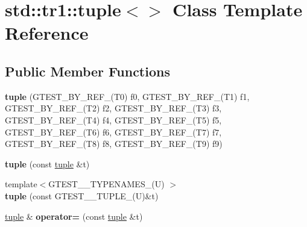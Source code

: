 \hypertarget{classstd_1_1tr1_1_1tuple}{}\section{std\+:\+:tr1\+:\+:tuple$<$$>$ Class Template Reference}
\label{classstd_1_1tr1_1_1tuple}
\subsection*{Public Member Functions}
\begin{DoxyCompactItemize}
\item 
\mbox{\label{classstd_1_1tr1_1_1tuple_a349b7948d183b7f05c1a5fd6aa4eaeb8}} 
{\bfseries tuple} (G\+T\+E\+S\+T\+\_\+\+B\+Y\+\_\+\+R\+E\+F\+\_\+(T0) f0, G\+T\+E\+S\+T\+\_\+\+B\+Y\+\_\+\+R\+E\+F\+\_\+(T1) f1, G\+T\+E\+S\+T\+\_\+\+B\+Y\+\_\+\+R\+E\+F\+\_\+(T2) f2, G\+T\+E\+S\+T\+\_\+\+B\+Y\+\_\+\+R\+E\+F\+\_\+(T3) f3, G\+T\+E\+S\+T\+\_\+\+B\+Y\+\_\+\+R\+E\+F\+\_\+(T4) f4, G\+T\+E\+S\+T\+\_\+\+B\+Y\+\_\+\+R\+E\+F\+\_\+(T5) f5, G\+T\+E\+S\+T\+\_\+\+B\+Y\+\_\+\+R\+E\+F\+\_\+(T6) f6, G\+T\+E\+S\+T\+\_\+\+B\+Y\+\_\+\+R\+E\+F\+\_\+(T7) f7, G\+T\+E\+S\+T\+\_\+\+B\+Y\+\_\+\+R\+E\+F\+\_\+(T8) f8, G\+T\+E\+S\+T\+\_\+\+B\+Y\+\_\+\+R\+E\+F\+\_\+(T9) f9)
\item 
\mbox{\label{classstd_1_1tr1_1_1tuple_ade1807f6e6b36daa6387c3b00dbd3be6}} 
{\bfseries tuple} (const \mbox{\hyperlink{classstd_1_1tr1_1_1tuple}{tuple}} \&t)
\item 
\mbox{\label{classstd_1_1tr1_1_1tuple_a7ff289d5c5a605e4a4f8fb56913f7370}} 
{\footnotesize template$<$G\+T\+E\+S\+T\+\_\+\_\+\+T\+Y\+P\+E\+N\+A\+M\+E\+S\+\_\+(\+U) $>$ }\\{\bfseries tuple} (const G\+T\+E\+S\+T\+\_\+\_\+\+T\+U\+P\+L\+E\+\_\+(U)\&t)
\item 
\mbox{\label{classstd_1_1tr1_1_1tuple_ae52bd211e87c30ea7243246fa06bf038}} 
\mbox{\hyperlink{classstd_1_1tr1_1_1tuple}{tuple}} \& {\bfseries operator=} (const \mbox{\hyperlink{classstd_1_1tr1_1_1tuple}{tuple}} \&t)
\item 
\mbox{\label{classstd_1_1tr1_1_1tuple_a9ed59ab84e2ff750d0a188c3d9dac819}} 

\end{DoxyCompactItemize}
